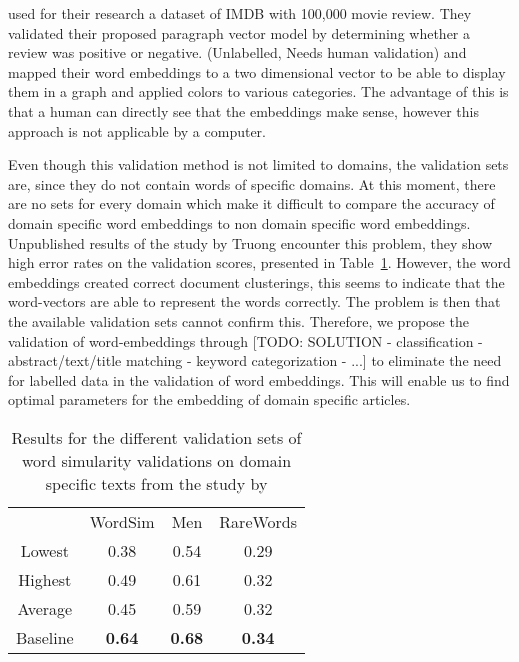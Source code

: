 \documentclass[../../Thesis.tex]{subfiles}
\begin{document}
\citet{le2014distributed} used for their research a dataset of IMDB with 100,000 movie review. They validated their proposed paragraph vector model by determining whether a review was positive or negative.
(Unlabelled, Needs human validation)\citet{dai2015document} and \citet{hinton2003stochastic} mapped their word embeddings to a two dimensional vector to be able to display them in a graph and applied colors to various categories. The advantage of this is that a human can directly see that the embeddings make sense, however this approach is not applicable by a computer.

 Even though this validation method is not limited to domains, the validation sets are, since they do not contain words of specific domains. At this moment, there are no sets for every domain which make it difficult to compare the accuracy of domain specific word embeddings to non domain specific word embeddings.
Unpublished results of the study by Truong encounter this problem, they show high error rates on the validation scores, presented in Table~\ref{table:truongErrorRates}. However, the word embeddings created correct document clusterings\cite{Truong2017Thesis}, this seems to indicate that the word-vectors are able to represent the words correctly. The problem is then that the available validation sets cannot confirm this. Therefore, we propose the validation of word-embeddings through [TODO: SOLUTION - classification - abstract/text/title matching - keyword categorization - ...] to eliminate the need for labelled data in the validation of word embeddings. This will enable us to find optimal parameters for the embedding of domain specific articles.
\begin{table}
\begin{center}
\begin{tabular}{c c c c}
&WordSim & Men & RareWords\\
Lowest & 0.38 & 0.54 & 0.29 \\
Highest & 0.49 & 0.61 & 0.32\\
Average & 0.45 & 0.59 & 0.32\\
Baseline & \textbf{0.64} & \textbf{0.68} & \textbf{0.34}
\end{tabular}
\end{center}
\caption{Results for the different validation sets of word simularity validations on domain specific texts from the study by \citet{Truong2017Thesis}}\label{table:truongErrorRates}
\end{table}
\end{document}

